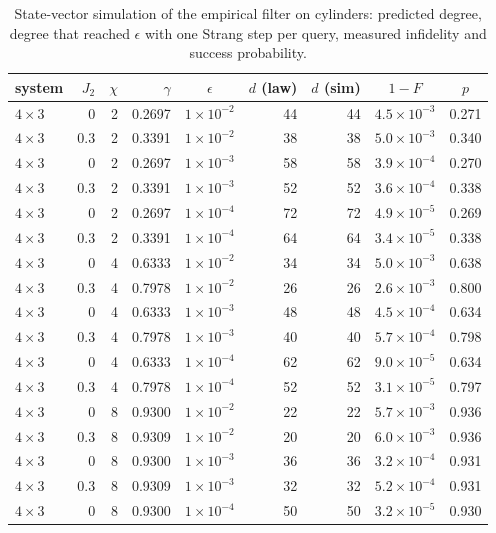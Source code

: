 \documentclass[10pt]{article}
\begin{document}
\begin{table}[h]
\centering\small
\caption{State-vector simulation of the empirical filter on cylinders: predicted degree, degree that
reached $\epsilon$ with one Strang step per query, measured infidelity and success probability.}
\label{tab:sim}
\begin{tabular}{lrrrcrrcc}
\toprule
system & $J_2$ & $\chi$ & $\gamma$ & $\epsilon$ & $d$ (law) & $d$ (sim) & $1-F$ & $p$ \\
\midrule
$4\times3$ & 0 & 2 & 0.2697 & $1\times10^{-2}$ & 44 & 44 & $4.5\times10^{-3}$ & 0.271 \\
$4\times3$ & 0.3 & 2 & 0.3391 & $1\times10^{-2}$ & 38 & 38 & $5.0\times10^{-3}$ & 0.340 \\
$4\times3$ & 0 & 2 & 0.2697 & $1\times10^{-3}$ & 58 & 58 & $3.9\times10^{-4}$ & 0.270 \\
$4\times3$ & 0.3 & 2 & 0.3391 & $1\times10^{-3}$ & 52 & 52 & $3.6\times10^{-4}$ & 0.338 \\
$4\times3$ & 0 & 2 & 0.2697 & $1\times10^{-4}$ & 72 & 72 & $4.9\times10^{-5}$ & 0.269 \\
$4\times3$ & 0.3 & 2 & 0.3391 & $1\times10^{-4}$ & 64 & 64 & $3.4\times10^{-5}$ & 0.338 \\
$4\times3$ & 0 & 4 & 0.6333 & $1\times10^{-2}$ & 34 & 34 & $5.0\times10^{-3}$ & 0.638 \\
$4\times3$ & 0.3 & 4 & 0.7978 & $1\times10^{-2}$ & 26 & 26 & $2.6\times10^{-3}$ & 0.800 \\
$4\times3$ & 0 & 4 & 0.6333 & $1\times10^{-3}$ & 48 & 48 & $4.5\times10^{-4}$ & 0.634 \\
$4\times3$ & 0.3 & 4 & 0.7978 & $1\times10^{-3}$ & 40 & 40 & $5.7\times10^{-4}$ & 0.798 \\
$4\times3$ & 0 & 4 & 0.6333 & $1\times10^{-4}$ & 62 & 62 & $9.0\times10^{-5}$ & 0.634 \\
$4\times3$ & 0.3 & 4 & 0.7978 & $1\times10^{-4}$ & 52 & 52 & $3.1\times10^{-5}$ & 0.797 \\
$4\times3$ & 0 & 8 & 0.9300 & $1\times10^{-2}$ & 22 & 22 & $5.7\times10^{-3}$ & 0.936 \\
$4\times3$ & 0.3 & 8 & 0.9309 & $1\times10^{-2}$ & 20 & 20 & $6.0\times10^{-3}$ & 0.936 \\
$4\times3$ & 0 & 8 & 0.9300 & $1\times10^{-3}$ & 36 & 36 & $3.2\times10^{-4}$ & 0.931 \\
$4\times3$ & 0.3 & 8 & 0.9309 & $1\times10^{-3}$ & 32 & 32 & $5.2\times10^{-4}$ & 0.931 \\
$4\times3$ & 0 & 8 & 0.9300 & $1\times10^{-4}$ & 50 & 50 & $3.2\times10^{-5}$ & 0.930 \\

\end{tabular}
\end{table}
\end{document}
